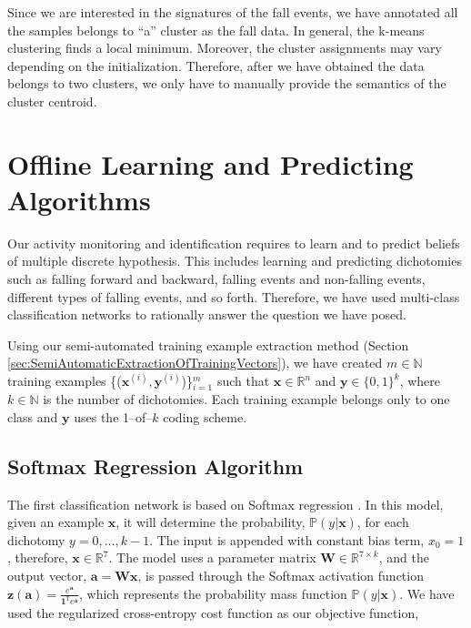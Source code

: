 \documentclass[]{IEEEtran}
\begin{document}
Since we are 
interested in the signatures of the fall events, we have annotated all the samples belongs 
to ``a'' cluster as the fall data. In general, the k-means clustering finds a 
local minimum. Moreover, the cluster assignments may vary depending on the 
initialization. Therefore, after we have obtained the data belongs to two clusters, we 
only have to manually provide the semantics of the cluster centroid. 

\section{Offline Learning and Predicting Algorithms}
\label{sec:OffLineLearning}


Our activity monitoring and identification requires to learn and to predict beliefs of 
multiple 
discrete hypothesis. This includes learning and predicting dichotomies such as falling 
forward and 
backward, falling events and non-falling events, different types of falling events, and 
so forth. 
Therefore, 
we have used multi-class classification networks to rationally answer the question we 
have posed.

Using our semi-automated training example extraction method (Section 
\ref{sec:SemiAutomaticExtractionOfTrainingVectors}), we have created $m \in 
\mathbb{N}$ 
training examples 
\{($\mathbf{x}^{(i)}, \mathbf{y}^{(i)}$)\}$_{i=1}^m$ such that $\mathbf{x} \in 
\mathbb{R}^{n}$ 
and 
$\mathbf{y} \in 
\{0,1\}^k$, where  $k \in 
\mathbb{N}$ is the number of dichotomies. Each training example belongs only to one class 
and $\mathbf{y}$ uses the 1--of--$k$ coding scheme.    

\subsection{Softmax Regression Algorithm}
\label{sec:SoftmaxRegrationAlgorthm}

The first classification network is based on Softmax regression \cite{Bishop06a}. In this 
model, given an 
example $\mathbf{x}$, it will determine the probability, $\mathbb{P}(y | \mathbf{x})$, 
for 
each dichotomy $y=0,\ldots,k-1$. The input is appended with constant bias 
term, $x_0 = 1$, therefore, $\mathbf{x} \in \mathbb{R}^7$. The model uses a parameter 
matrix 
$\mathbf{W} 
\in \mathbb{R}^{7 \times k}$, and the output vector, $\mathbf{a} = \mathbf{Wx}$, is 
passed 
through 
the 
Softmax 
activation function $\mathbf{z(a)} = \frac{e^{\mathbf{a}}}{\mathbf{1}^\mathtt{T}
e^{\mathbf{a}}}$, which represents the probability mass function $\mathbb{P}(y | 
\mathbf{x})$. We have 
used the regularized cross-entropy cost function as our objective function, 
\end{document}
